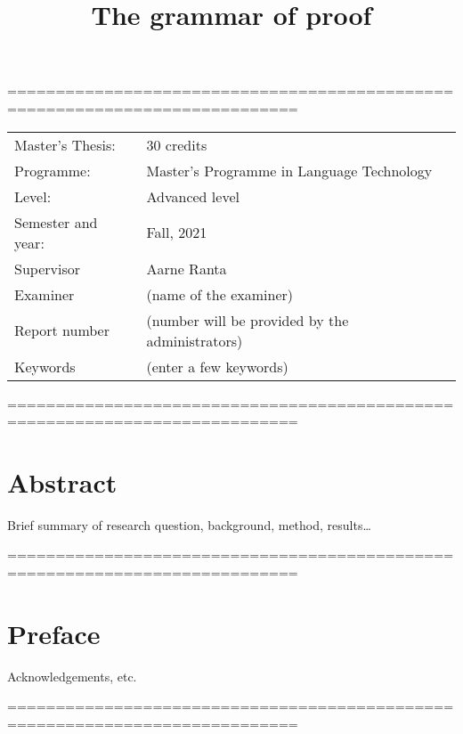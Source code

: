 \documentclass[11pt, a4paper]{article}
\title{The grammar of proof} %
\begin{document}
============================================================================
\begin{titlepage}

\maketitle

\vfill

\begingroup \renewcommand*{\arraystretch}{1.2}
\begin{tabular}{l@{\hskip 20mm}l} \hline Master's Thesis: & 30 credits\\
Programme: & Master’s Programme in Language Technology\\ Level: & Advanced level
\\ Semester and year: & Fall, 2021\\ Supervisor & Aarne Ranta\\ Examiner & (name
of the examiner)\\ Report number & (number will be provided by the
administrators) \\ Keywords & (enter a few keywords)
\end{tabular} \endgroup

\thispagestyle{empty}
\end{titlepage}

============================================================================
\newpage \singlespacing
\section*{Abstract}

Brief summary of research question, background, method, results\ldots

\thispagestyle{empty}

============================================================================
\newpage
\section*{Preface}

Acknowledgements, etc.

\thispagestyle{empty}

============================================================================
\newpage
\end{document}
